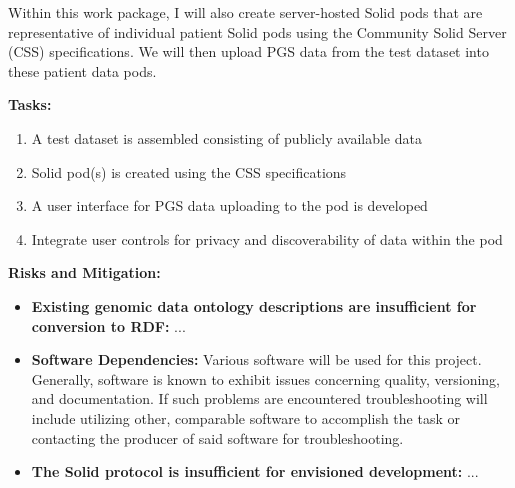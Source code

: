 \documentclass{article}
\begin{document}
Within this work package, I will also create server-hosted Solid pods that are representative of individual patient Solid pods using the Community Solid Server (CSS) specifications. We will then upload PGS data from the test dataset into these patient data pods. 

\textbf{Tasks:}  
\begin{enumerate}
	\item A test dataset is assembled consisting of publicly available data
	\item Solid pod(s) is created using the CSS specifications
	\item A user interface for PGS data uploading to the pod is developed
	\item Integrate user controls for privacy and discoverability of data within the pod
\end{enumerate}

\textbf{Risks and Mitigation:} 
\begin{itemize}
	\item \textbf{Existing genomic data ontology descriptions are insufficient for conversion to RDF:} ...
	\item \textbf{Software Dependencies:} Various software will be used for this project. Generally, software is known to exhibit issues concerning quality, versioning, and documentation. If such problems are encountered troubleshooting will include utilizing other, comparable software to accomplish the task or contacting the producer of said software for troubleshooting.
	\item \textbf{The Solid protocol is insufficient for envisioned development:} ...
\end{itemize}
\end{document}

